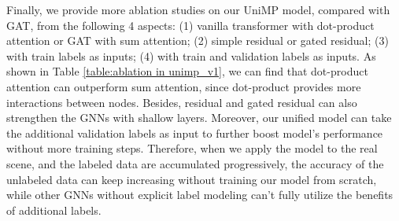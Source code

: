 Finally, we provide more ablation studies on our UniMP model, compared with GAT, from the following 4 aspects: 
(1) vanilla transformer with dot-product attention or GAT with sum attention; 
(2) simple residual or gated residual;
(3) with train labels as inputs;
(4) with train and validation labels as inputs.
As shown in Table \ref{table:ablation in unimp_v1}, we can find that dot-product attention can outperform sum attention, since dot-product provides more interactions between nodes. Besides, residual and gated residual can also strengthen the GNNs with shallow layers. Moreover, our unified model can take the additional validation labels as input to further boost model's performance without more training steps. Therefore, when we apply the model to the real scene, and the labeled data are accumulated progressively, the accuracy of the unlabeled data can keep increasing without training our model from scratch, while other GNNs without explicit label modeling can't fully utilize the benefits of additional labels. 


